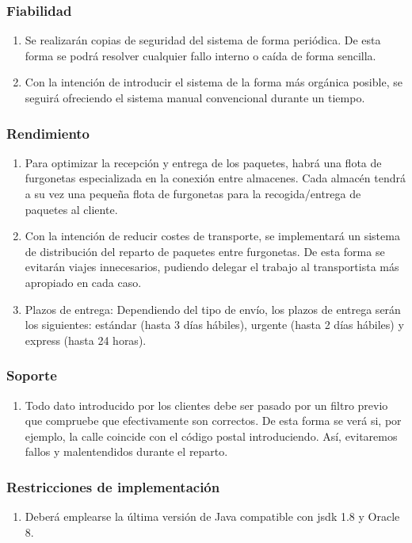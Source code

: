 \subsubsection{Fiabilidad}
\begin{enumerate}
	\item Se realizarán copias de seguridad del sistema de forma periódica. De esta forma se podrá resolver cualquier fallo interno o caída de forma sencilla.
	\item Con la intención de introducir el sistema de la forma más orgánica posible, se seguirá ofreciendo el sistema manual convencional durante un tiempo.
\end{enumerate}

\subsubsection{Rendimiento}
\begin{enumerate}
	\item Para optimizar la recepción y entrega de los paquetes, habrá una flota de furgonetas especializada en la conexión entre almacenes. Cada almacén tendrá a su vez una pequeña flota de furgonetas para la recogida/entrega de paquetes al cliente.
	\item Con la intención de reducir costes de transporte, se implementará un sistema de distribución del reparto de paquetes entre furgonetas. De esta forma se evitarán viajes innecesarios, pudiendo delegar el trabajo al transportista más apropiado en cada caso.
	\item Plazos de entrega: Dependiendo del tipo de envío, los plazos de entrega serán los siguientes: estándar (hasta 3 días hábiles), urgente (hasta 2 días hábiles) y express (hasta 24 horas).
\end{enumerate}

\subsubsection{Soporte}
\begin{enumerate}
	\item Todo dato introducido por los clientes debe ser pasado por un filtro previo que compruebe que efectivamente son correctos. De esta forma se verá si, por ejemplo, la calle coincide con el código postal introduciendo. Así, evitaremos fallos y malentendidos durante el reparto.
\end{enumerate}
	
\subsubsection{Restricciones de implementación}
\begin{enumerate}
	\item Deberá emplearse la última versión de Java compatible con jsdk 1.8 y Oracle 8.
\end{enumerate}
